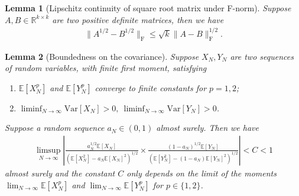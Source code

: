 \documentclass[12pt]{article}
\newtheorem{lemma}{Lemma}
\newcommand{\E}{\mathbb E}								%
\begin{document}


\begin{lemma}[Lipschitz continuity of square root matrix under F-norm]\label{lem:holder_continuity_Frobenius}
	Suppose $A,B\in\mathbb{R}^{k\times k}$ are two positive definite matrices, then we have 
	\begin{align*}
		\|A^{1/2}-B^{1/2}\|_{\mathrm{F}}\leq \sqrt{k}\|A-B\|_{\mathrm{F}}^{1/2}.
	\end{align*}
\end{lemma}




\begin{lemma}[Boundedness on the covariance]\label{lem:upper_bound_cov}
	Suppose $X_N,Y_N$ are two sequences of random variables, with finite first moment, satisfying 
	\begin{enumerate}
		\item $\E[X_N^{p}]$ and $\E[Y_N^{p}]$ converge to finite constants for $p=1,2$;
		\item $\liminf_{N\rightarrow\infty}\mathrm{Var}[X_N]>0,\ \liminf_{N\rightarrow\infty}\mathrm{Var}[Y_N]>0$.
	\end{enumerate}
	Suppose a random sequence $a_N\in (0,1)$ almost surely. Then we have 
	\begin{align}\label{eq:upper_bound_cov}
		\limsup_{N\rightarrow\infty}\left|\frac{a_N^{1/2}\E[X_N]}{(\E[X_N^2]-a_N\E[X_N]^2)^{1/2}}\times \frac{(1-a_N)^{1/2}\E[Y_N]}{(\E[Y_N^2]-(1-a_N)\E[Y_N]^2)^{1/2}}\right|<C<1
	\end{align}
	almost surely and the constant $C$ only depends on the limit of the moments $\lim_{N\rightarrow\infty}\E[X_N^p]$ and $\lim_{N\rightarrow\infty}\E[Y_N^p]$ for $p\in\{1,2\}$.
\end{lemma}
\end{document}
